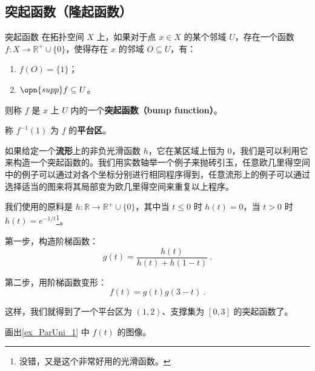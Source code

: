 \subsection{突起函数（隆起函数）}

\begin{definition}{突起函数}
在拓扑空间 $X$ 上，如果对于点 $x\in X$ 的某个邻域 $U$，存在一个函数 $f:X\to\mathbb{R}^+\cup\{0\}$，使得存在 $x$ 的邻域 $O\subseteq U$，有：
\begin{enumerate}
\item $f(O)=\{1\}$；
\item $\opn{supp} f \subseteq U$。
\end{enumerate}
则称 $f$ 是 $x$ 上 $U$ 内的一个\textbf{突起函数（bump function）}。

称 $f^{-1}(1)$ 为 $f$ 的\textbf{平台区}。
\end{definition}

如果给定一个\textbf{流形}上的非负光滑函数 $h$，它在某区域上恒为 $0$，我们是可以利用它来构造一个突起函数的。我们用实数轴举一个例子来抛砖引玉，任意欧几里得空间中的例子可以通过对各个坐标分别进行相同程序得到，任意流形上的例子可以通过选择适当的图来将其局部变为欧几里得空间来重复以上程序。

\begin{example}{}\label{ex_ParUni_1}
我们使用的原料是 $h:\mathbb{R}\to\mathbb{R}^+\cup\{0\}$，其中当 $t\leq 0$ 时 $h(t)=0$，当 $t>0$ 时 $h(t)=e^{-1/t}$\footnote{没错，又是这个非常好用的光滑函数。}。

第一步，构造阶梯函数：
\begin{equation}
g(t)=\frac{h(t)}{h(t)+h(1-t)}~.
\end{equation}

第二步，用阶梯函数变形：
\begin{equation}
f(t)=g(t)g(3-t)~.
\end{equation}

这样，我们就得到了一个平台区为 $(1, 2)$、支撑集为 $[0, 3]$ 的突起函数了。
\end{example}

\begin{exercise}{}
画出\autoref{ex_ParUni_1} 中 $f(t)$ 的图像。
\end{exercise}





